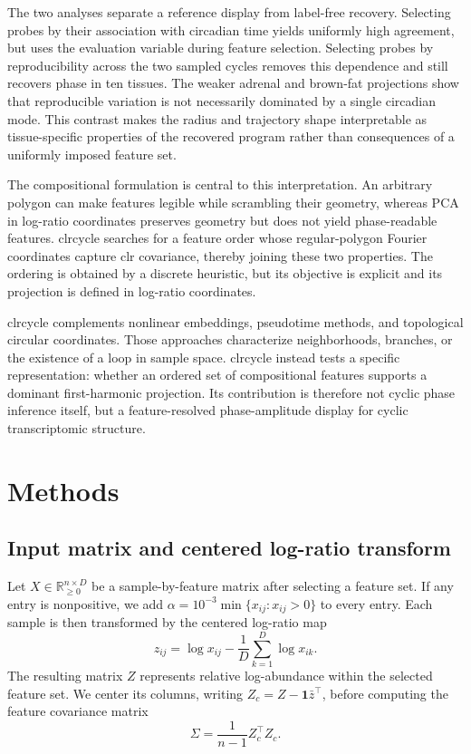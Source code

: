 \documentclass[10pt,twocolumn]{article}
\begin{document}
The two analyses separate a reference display from label-free recovery. Selecting
probes by their association with circadian time yields uniformly high agreement,
but uses the evaluation variable during feature selection. Selecting probes by
reproducibility across the two sampled cycles removes this dependence and still
recovers phase in ten tissues. The weaker adrenal and brown-fat projections show
that reproducible variation is not necessarily dominated by a single circadian
mode. This contrast makes the radius and trajectory shape interpretable as
tissue-specific properties of the recovered program rather than consequences of
a uniformly imposed feature set.

The compositional formulation is central to this interpretation. An arbitrary
polygon can make features legible while scrambling their geometry, whereas PCA in
log-ratio coordinates preserves geometry but does not yield phase-readable
features. clrcycle searches for a feature order whose regular-polygon Fourier
coordinates capture clr covariance, thereby joining these two properties. The
ordering is obtained by a discrete heuristic, but its objective is explicit and
its projection is defined in log-ratio coordinates.

clrcycle complements nonlinear embeddings, pseudotime methods, and topological
circular coordinates. Those approaches characterize neighborhoods, branches, or
the existence of a loop in sample space. clrcycle instead tests a specific
representation: whether an ordered set of compositional features supports a
dominant first-harmonic projection. Its contribution is therefore not cyclic
phase inference itself, but a feature-resolved phase-amplitude display for
cyclic transcriptomic structure.

\section{Methods}

\subsection{Input matrix and centered log-ratio transform}

Let \(X\in\mathbb{R}_{\geq 0}^{n\times D}\) be a sample-by-feature matrix after
selecting a feature set. If any entry is nonpositive, we add
\(\alpha=10^{-3}\min\{x_{ij}:x_{ij}>0\}\) to every entry. Each sample is then
transformed by the centered log-ratio map
\[
z_{ij}
= \log x_{ij}
- \frac{1}{D}\sum_{k=1}^{D}\log x_{ik}.
\]
The resulting matrix \(Z\) represents relative log-abundance within the selected
feature set. We center its columns, writing
\(Z_c=Z-\mathbf{1}\bar z^\top\), before computing the feature covariance matrix
\[
\Sigma = \frac{1}{n-1} Z_c^\top Z_c.
\]
\end{document}
